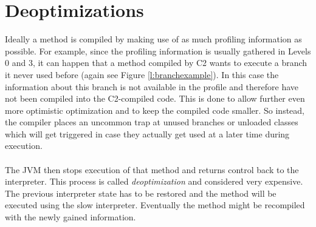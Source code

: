 \section{Deoptimizations}
\label{s:deoptimizations}
Ideally a method is compiled by making use of as much profiling information as possible.
For example, since the profiling information is usually gathered in Levels 0 and 3, it can happen that a method compiled by C2 wants to execute a branch it never used before (again see Figure \ref{l:branchexample}).
In this case the information about this branch is not available in the profile and therefore have not been compiled into the C2-compiled code.
This is done to allow further even more optimistic optimization and to keep the compiled code smaller. So instead, the compiler places an uncommon trap at unused branches or unloaded classes which will get triggered in case they actually get used at a later time during execution.
\\\\
The JVM then stops execution of that method and returns control back to the interpreter. This process is called \textit{deoptimization} and considered very expensive. The previous interpreter state has to be restored and the method will be executed using the slow interpreter. Eventually the method might be recompiled with the newly gained information.

